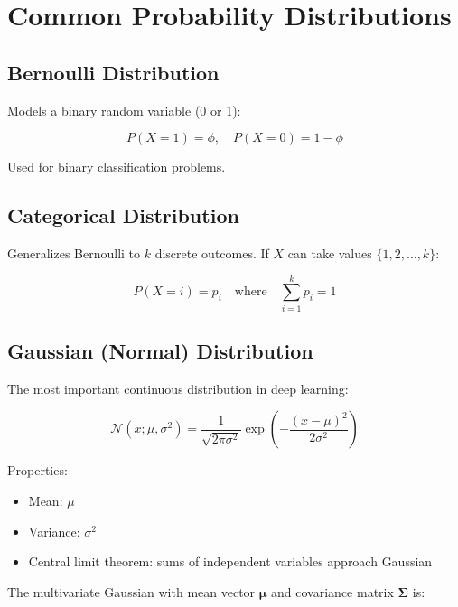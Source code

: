 
\section{Common Probability Distributions}
\label{sec:common-distributions}

\subsection{Bernoulli Distribution}

Models a binary random variable (0 or 1):

\begin{equation}
P(X=1) = \phi, \quad P(X=0) = 1-\phi
\end{equation}

Used for binary classification problems.

\subsection{Categorical Distribution}

Generalizes Bernoulli to $k$ discrete outcomes. If $X$ can take values $\{1, 2, \ldots, k\}$:

\begin{equation}
P(X=i) = p_i \quad \text{where} \quad \sum_{i=1}^{k} p_i = 1
\end{equation}

\subsection{Gaussian (Normal) Distribution}

The most important continuous distribution in deep learning:

\begin{equation}
\mathcal{N}(x; \mu, \sigma^2) = \frac{1}{\sqrt{2\pi\sigma^2}} \exp\left(-\frac{(x-\mu)^2}{2\sigma^2}\right)
\end{equation}

Properties:
\begin{itemize}
    \item Mean: $\mu$
    \item Variance: $\sigma^2$
    \item Central limit theorem: sums of independent variables approach Gaussian
\end{itemize}

The multivariate Gaussian with mean vector $\boldsymbol{\mu}$ and covariance matrix $\boldsymbol{\Sigma}$ is:

